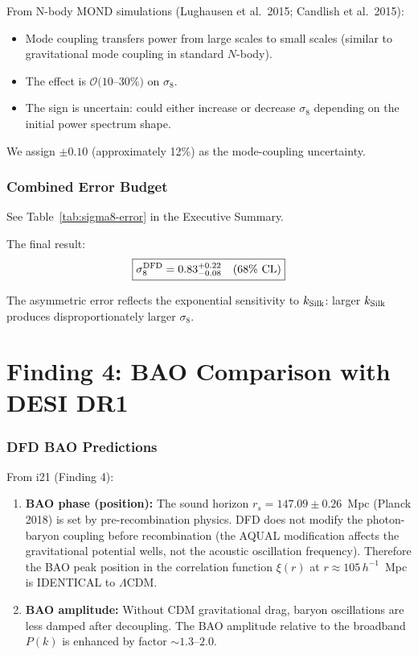 \documentclass[11pt]{article}
\newcommand{\LCDM}{$\Lambda$CDM}
\newcommand{\kSilk}{k_{\rm Silk}}
\begin{document}
From N-body MOND simulations (Lughausen et al.\ 2015; Candlish et al.\ 2015):
\begin{itemize}
\item Mode coupling transfers power from large scales to small scales
  (similar to gravitational mode coupling in standard $N$-body).
\item The effect is $\mathcal{O}(10$--$30\%)$ on $\sigma_8$.
\item The sign is uncertain: could either increase or decrease $\sigma_8$
  depending on the initial power spectrum shape.
\end{itemize}

We assign $\pm 0.10$ (approximately 12\%) as the mode-coupling uncertainty.

\section{Combined Error Budget}

See Table~\ref{tab:sigma8-error} in the Executive Summary.

The final result:
\begin{equation}
\boxed{\sigma_8^{\rm DFD} = 0.83^{+0.22}_{-0.08}\quad(68\%\text{ CL})}
\end{equation}

The asymmetric error reflects the exponential sensitivity to $\kSilk$:
larger $\kSilk$ produces disproportionately larger $\sigma_8$.


\part{Finding 4: BAO Comparison with DESI DR1}
\label{part:BAO}

\section{DFD BAO Predictions}

From i21 (Finding 4):
\begin{enumerate}
\item \textbf{BAO phase (position):}  The sound horizon
  $r_s = 147.09 \pm 0.26$~Mpc (Planck 2018) is set by pre-recombination
  physics.  DFD does not modify the photon-baryon coupling before
  recombination (the AQUAL modification affects the gravitational
  potential wells, not the acoustic oscillation frequency).  Therefore
  the BAO peak position in the correlation function
  $\xi(r)$ at $r \approx 105\,h^{-1}$~Mpc is IDENTICAL to \LCDM.

\item \textbf{BAO amplitude:}  Without CDM gravitational drag,
  baryon oscillations are less damped after decoupling.  The BAO amplitude
  relative to the broadband $P(k)$ is enhanced by factor $\sim 1.3$--$2.0$.
\end{enumerate}
\end{document}
